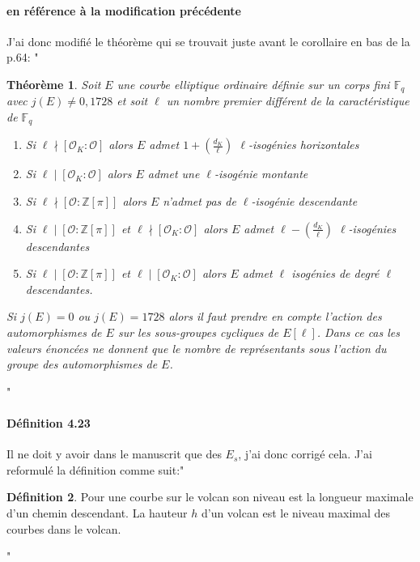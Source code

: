 \documentclass[10pt,a4paper]{article}
\theoremstyle{plain}
\newtheorem{thm}{Théorème}[section]
\theoremstyle{definition}
\theoremstyle{definition}
\theoremstyle{definition}
\theoremstyle{definition}
\theoremstyle{definition}
\newtheorem{defi}[thm]{Définition}
\theoremstyle{remark}
\theoremstyle{remark}
\theoremstyle{definition}
\begin{document}
\paragraph{ en référence à la modification précédente}{J'ai donc modifié le théorème qui se trouvait juste avant le corollaire en bas de la p.64: "\begin{thm}
\label{thm:Koh:cas}
Soit $E$ une courbe elliptique ordinaire définie sur un corps fini 
$\mathbb{F}_q$ avec $j(E)\neq 0, 1728$ et soit $\ell$ un nombre premier 
différent de la caractéristique de $\mathbb{F}_q$
\begin{enumerate}
\item Si $\ell \nmid [\mathcal{O}_K : \mathcal{O}]$ alors $E$ admet $ 1 + \left( \frac{d_K}{\ell} \right)$ $\ell$-isogénies horizontales
\item Si $\ell \mid [\mathcal{O}_K : \mathcal{O}]$ alors $E$ admet une $\ell$-isogénie montante
\item Si $\ell \nmid [\mathcal{O} : \mathbb{Z}[\pi]]$ alors $E$ n'admet pas de $\ell$-isogénie descendante
\item Si $\ell \mid [\mathcal{O} : \mathbb{Z}[\pi]]$ et $\ell \nmid [\mathcal{O}_K : \mathcal{O}]$ alors $E$ admet $\ell-\left( \frac{d_K}{\ell} \right)$ $\ell$-isogénies descendantes
\item  Si $\ell \mid [\mathcal{O} : \mathbb{Z}[\pi]]$ et $\ell \mid [\mathcal{O}_K : \mathcal{O}]$ alors $E$ admet $\ell$ isogénies de degré $\ell$ descendantes.
\end{enumerate}
Si $j(E)=0$ ou $j(E)=1728$ alors il faut prendre en compte l'action des 
automorphismes de $E$ sur les sous-groupes cycliques de $E[\ell]$. Dans ce cas
les valeurs énoncées ne donnent que le nombre de représentants 
sous l'action du groupe des automorphismes de $E$.
\end{thm}"}

\paragraph{Définition 4.23}{Il ne doit y avoir dans le manuscrit que des $E_s$, j'ai donc corrigé cela. J'ai reformulé la définition comme suit:"
\begin{defi}
\label{def:haut:vol}
Pour une courbe sur le volcan son niveau est la longueur maximale d'un chemin descendant.
\newline
La hauteur $h$ d'un volcan est le niveau maximal des courbes dans le volcan.
\end{defi}"}
\end{document}
